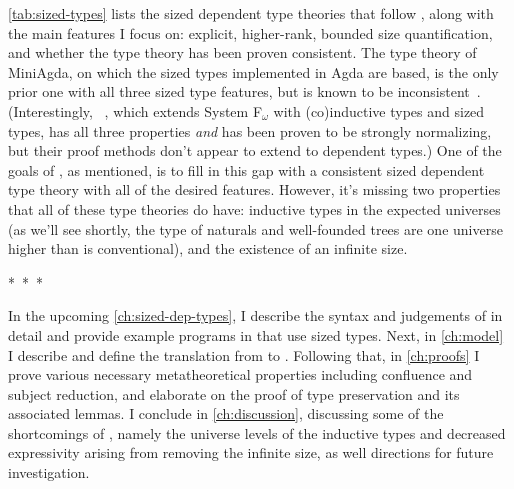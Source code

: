 \cref{tab:sized-types} lists the sized dependent type theories that follow \CIChat,
along with the main features I focus on:
explicit, higher-rank, bounded size quantification,
and whether the type theory has been proven consistent.
The type theory of MiniAgda, on which the sized types implemented in Agda are based,
is the only prior one with all three sized type features,
but is known to be inconsistent~\citep{infinity}.
(Interestingly, \Fcopomega~\citep{F-omega-cop}, which extends System F$_\omega$ with (co)inductive types and sized types,
has all three properties \emph{and} has been proven to be strongly normalizing,
but their proof methods don't appear to extend to dependent types.)
One of the goals of \lang, as mentioned, is to fill in this gap
with a consistent sized dependent type theory with all of the desired features.
However, it's missing two properties that all of these type theories do have:
inductive types in the expected universes
(as we'll see shortly, the type of naturals and well-founded trees
are one universe higher than is conventional),
and the existence of an infinite size.


\begin{center}
\mbox{* * *}
\end{center}
\vspace*{-0.5\baselineskip}

\noindent In the upcoming \cref{ch:sized-dep-types}, I describe the syntax and judgements of \lang in detail
and provide example programs in \lang that use sized types.
Next, in \cref{ch:model} I describe \CICE and define the translation from \lang to \CICE.
Following that, in \cref{ch:proofs} I prove various necessary metatheoretical properties
including confluence and subject reduction,
and elaborate on the proof of type preservation and its associated lemmas.
I conclude in \cref{ch:discussion}, discussing some of the shortcomings of \lang,
namely the universe levels of the inductive types and
decreased expressivity arising from removing the infinite size,
as well directions for future investigation.